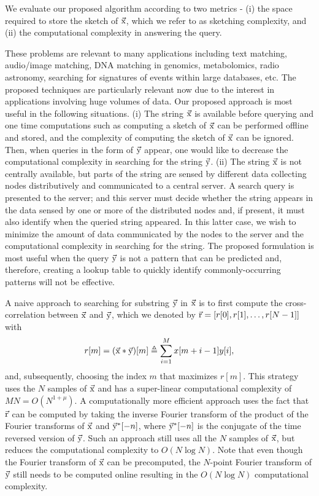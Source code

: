 We evaluate our proposed algorithm according to two metrics - (i) the space required to store the sketch of $\vec{\mathrm{x}}$, which we refer to as sketching complexity, and (ii) the computational complexity in answering the query.

These problems are relevant to many applications including text matching, audio/image matching, DNA matching in genomics, metabolomics, radio astronomy, searching for signatures of events within large databases, etc. The proposed techniques are particularly relevant now due to the interest in applications involving huge volumes of data. 
 Our proposed approach is most useful in the following situations.
(i) The string $\vec{\mathrm{x}}$ is available before querying and one time computations such as computing a sketch of $\vec{\mathrm{x}}$ can be performed offline and stored, and the complexity of computing the sketch of $\vec{\mathrm{x}}$ can be ignored. Then, when queries in the form of $\vec{\mathrm{y}}$ appear, one would like to decrease the computational complexity in searching for the string $\vec{\mathrm{y}}$. (ii) The string $\vec{\mathrm{x}}$ is not centrally available, but parts of the string are sensed by different data collecting nodes distributively and communicated to a central server. A search query is presented to the server; and this server must decide whether the string appears in the data sensed by one or more of the distributed nodes and, if present, it must also identify when the queried string appeared.
In this latter case, we wish to minimize the amount of data communicated by the nodes to the server and the computational complexity in searching for the string.
The proposed formulation is most useful when the query $\vec{\mathrm{y}}$ is not a pattern that can be predicted and, therefore, creating a lookup table to quickly identify commonly-occurring patterns will not be effective.

A naive approach to searching for substring $\vec{\mathrm{y}}$ in $\vec{\mathrm{x}}$ is to first compute the cross-correlation between $\vec{\mathrm{x}}$ and $\vec{\mathrm{y}}$, which we denoted by $\vec{\mathrm{r}}=[r[0], r[1],\ldots, r[N-1]]$ with
\begin{align}
\label{Eqn:DefCrossCorrelation}
r[m]=(\vec{\mathrm{x}}*\vec{\mathrm{y}})[m] \triangleq \sum_{i=1}^{M} x[m+i-1] y[i] ,
\end{align}
and, subsequently,  choosing the index $m$ that maximizes $r[m]$.
This strategy uses the $N$ samples of $\vec{\mathrm{x}}$ and has a super-linear computational complexity of $MN = O(N^{1+\mu})$. A computationally more efficient approach uses the fact that $\vec{\mathrm{r}}$ can be computed by taking the inverse Fourier transform of the product of the Fourier transforms of $\vec{\mathrm{x}}$ and $ \vec{\mathrm{y}}^*[-n]$, where $\vec{\mathrm{y}}^*[-n]$ is the conjugate of the time reversed version of $\vec{\mathrm{y}}$.
Such an approach still uses all the $N$ samples of $\vec{\mathrm{x}}$, but reduces the computational complexity to $O(N \log N)$. Note that even though the Fourier transform of $\vec{\mathrm{x}}$ can be precomputed, the $N$-point Fourier transform of $\vec{\mathrm{y}}$ still needs to be computed online resulting in the $O(N \log N)$ computational complexity.

